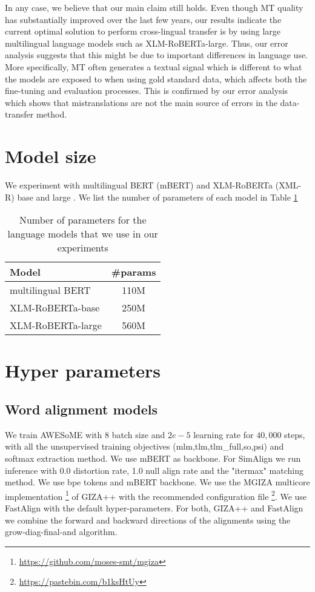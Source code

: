 \documentclass[11pt]{article}
\begin{document}
In any case, we believe that our main claim still holds. Even though MT quality has substantially improved over the last few years, our results indicate the current optimal solution to perform cross-lingual transfer is by using large multilingual language models such as XLM-RoBERTa-large. Thus, our error analysis suggests that this might be due to important differences in language use. More specifically, MT often generates a textual signal which is different to what the models are exposed to when using gold standard data, which affects both the fine-tuning and evaluation processes. This is confirmed by our error analysis which shows that mistranslations are not the main source of errors in the data-transfer method.






\appendix
\label{apen:Apendix}

\section{Model size}\label{apen:ModelSize}
We experiment with multilingual BERT (mBERT) \cite{DBLP:conf/naacl/DevlinCLT19} and XLM-RoBERTa (XML-R) base and large \cite{xlmr}. We list the number of parameters of each model in Table \ref{tab:ParamNo}
\begin{table}[htbp]
    \centering
\begin{tabular}{l|c}
Model & \#params \\
\hline 
multilingual BERT & 110M \\
XLM-RoBERTa-base & 250M \\
XLM-RoBERTa-large & 560M \\
\end{tabular}
    \caption{Number of parameters for the language models that we use in our experiments}
    \label{tab:ParamNo}
\end{table}

\section{Hyper parameters}\label{sec:appendix-hyper}

\subsection{Word alignment models}
We train AWESoME with $8$ batch size and $2e-5$ learning rate for $40,000$ steps, with all the unsupervised training objectives (mlm,tlm,tlm\_full,so,psi) and softmax extraction method. We use mBERT as backbone. 
For SimAlign we run inference with 0.0 distortion rate, 1.0 null align rate and the "itermax" matching method. We use bpe tokens and mBERT backbone. 
We use the MGIZA multicore implementation \footnote{\url{https://github.com/moses-smt/mgiza}} of GIZA++ with the recommended configuration file \footnote{\url{https://pastebin.com/b1ksHtUy}}. We use FastAlign with the default hyper-parameters. For both, GIZA++ and FastAlign we combine the forward and backward directions of the alignments using the grow-diag-final-and algorithm.
\end{document}
